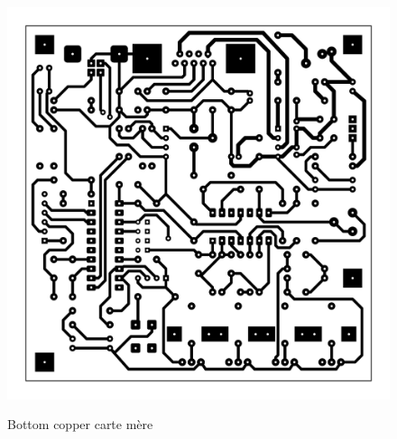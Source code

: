 \documentclass[11pt, french]{article} %
\begin{document}
\begin{figure}[!h]
	\centering
	\includegraphics[width=15cm]{SolutionAnalogique/bottom_copper.png}
	\label{cout}
	\caption{Bottom copper carte mère}
\end{figure}
\end{document}
